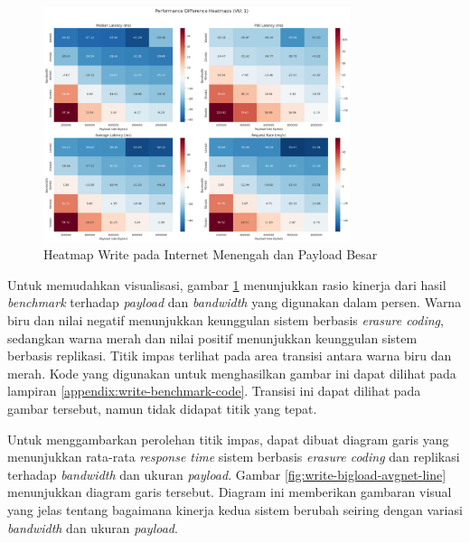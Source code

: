 \begin{enumerate}
  \begin{figure}[ht]
    \centering
    \includegraphics[width=0.8\textwidth]{resources/chapter-4/write_bigload_avgnet_heatmap.png}

    \caption{Heatmap Write pada Internet Menengah dan Payload Besar}
    \label{fig:write-bigload-avgnet-heatmap}
  \end{figure}

  Untuk memudahkan visualisasi, gambar \ref{fig:write-bigload-avgnet-heatmap} menunjukkan rasio kinerja dari hasil \textit{benchmark} terhadap \textit{payload} dan \textit{bandwidth} yang digunakan dalam persen. Warna biru dan nilai negatif menunjukkan keunggulan sistem berbasis \textit{erasure coding}, sedangkan warna merah dan nilai positif menunjukkan keunggulan sistem berbasis replikasi. Titik impas terlihat pada area transisi antara warna biru dan merah.  Kode yang digunakan untuk menghasilkan gambar ini dapat dilihat pada lampiran \ref{appendix:write-benchmark-code}. Transisi ini dapat dilihat pada gambar tersebut, namun tidak didapat titik yang tepat.

  Untuk menggambarkan perolehan titik impas, dapat dibuat diagram garis yang menunjukkan rata-rata \textit{response time} sistem berbasis \textit{erasure coding} dan replikasi terhadap \textit{bandwidth} dan ukuran \textit{payload}. Gambar \ref{fig:write-bigload-avgnet-line} menunjukkan diagram garis tersebut. Diagram ini memberikan gambaran visual yang jelas tentang bagaimana kinerja kedua sistem berubah seiring dengan variasi \textit{bandwidth} dan ukuran \textit{payload}.


\end{enumerate}

